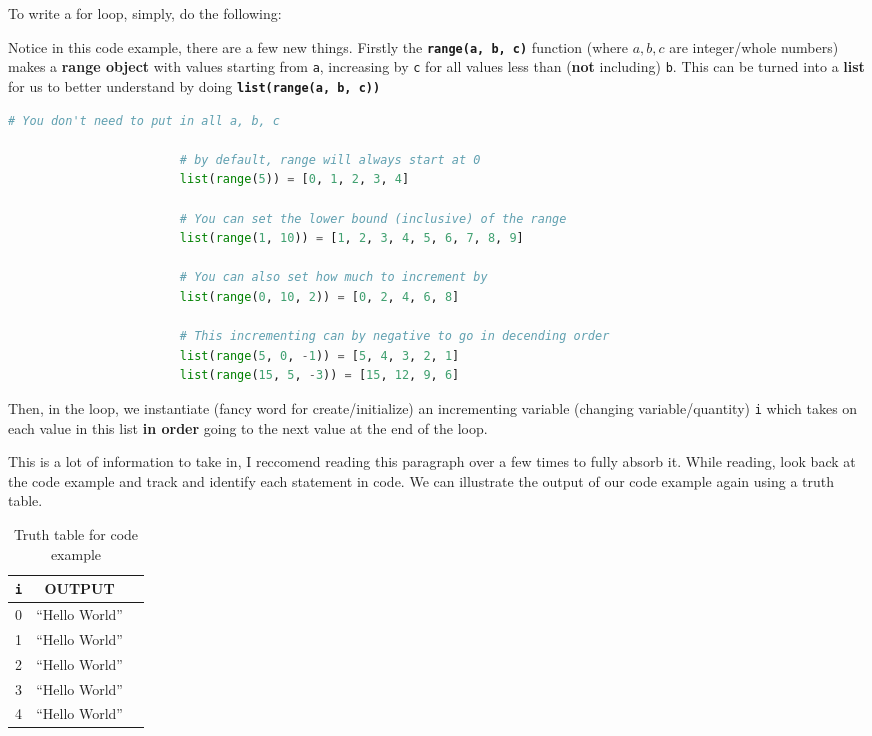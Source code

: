 \documentclass[12pt,a4paper]{book}
\newcommand{\coderef}[1]{Code Ex. \ref{#1}}
\begin{document}
					To write a for loop, simply, do the following:
					

					Notice in this code example, there are a few new things. Firstly the \textbf{\texttt{range(a, b, c)}} function (where $a, b, c$ are integer/whole numbers) makes a \textbf{range object} with values starting from \texttt{a}, increasing by \texttt{c} for all values less than (\textbf{not} including) \texttt{b}. This can be turned into a \textbf{list} for us to better understand by doing \textbf{\texttt{list(range(a, b, c))}}
					\begin{lstlisting}[language=python, title={range function}, caption={How the Range function works} label={code-py:range}]
						# You don't need to put in all a, b, c

						# by default, range will always start at 0
						list(range(5)) = [0, 1, 2, 3, 4]

						# You can set the lower bound (inclusive) of the range
						list(range(1, 10)) = [1, 2, 3, 4, 5, 6, 7, 8, 9]

						# You can also set how much to increment by
						list(range(0, 10, 2)) = [0, 2, 4, 6, 8]

						# This incrementing can by negative to go in decending order
						list(range(5, 0, -1)) = [5, 4, 3, 2, 1]
						list(range(15, 5, -3)) = [15, 12, 9, 6]
					\end{lstlisting}
					
					Then, in the loop, we instantiate (fancy word for create/initialize) an incrementing variable (changing variable/quantity) \texttt{i} which takes on each value in this list \textbf{in order} going to the next value at the end of the loop.
					
					This is a lot of information to take in, I reccomend reading this paragraph over a few times to fully absorb it. While reading, look back at the code example and track and identify each statement in code. We can illustrate the output of our code example again using a truth table.

					\begin{table}[H]
						\centering
						\begin{tabular}{c|c|c}
							\texttt{i} & OUTPUT \\
							\hline
							0 &  ``Hello World'' \\
							1 &  ``Hello World'' \\
							2 &  ``Hello World'' \\
							3 &  ``Hello World'' \\
							4 &  ``Hello World'' \\
						\end{tabular}
						\caption{Truth table for code example}
						\label{tab:for-def-tt}
					\end{table}
\end{document}
